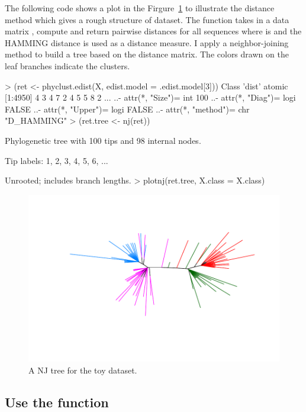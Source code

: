 The following code shows a plot in the Firgure~\ref{fig:toynj}
to illustrate the distance method which gives a rough structure
of dataset.
The  function takes in a data
matrix , compute and return pairwise distances for all sequences
where  is  and the HAMMING distance
is used as a distance measure.
I apply a neighbor-joining method to build a tree based
on the distance matrix. The colors drawn on the leaf branches indicate
the clusters.
\begin{Code}
> (ret <- phyclust.edist(X, edist.model = .edist.model[3]))
Class 'dist'  atomic [1:4950] 4 3 4 7 2 4 5 5 8 2 ...
  ..- attr(*, "Size")= int 100
  ..- attr(*, "Diag")= logi FALSE
  ..- attr(*, "Upper")= logi FALSE
  ..- attr(*, "method")= chr "D_HAMMING"
> (ret.tree <- nj(ret))

Phylogenetic tree with 100 tips and 98 internal nodes.

Tip labels:
        1, 2, 3, 4, 5, 6, ...

Unrooted; includes branch lengths.
> plotnj(ret.tree, X.class = X.class)
\end{Code}
\begin{figure}[h]
\begin{center}
\includegraphics[width=5.0in]{./phyclust-graph/toynj}
\caption{A NJ tree for the toy dataset.}
\label{fig:toynj}
\end{center}
\end{figure}


\subsection[Use the phyclust() function]{Use the  function}
\label{sec:phyclust}


